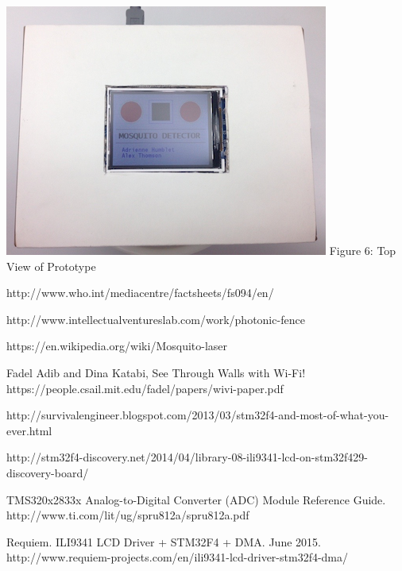 \documentclass[twoside]{article}
\begin{document}
\begin{multicols}{2}
\begin{center}
\includegraphics[scale=0.40]{topView.png}
\newline Figure 6:  Top View of Prototype
\end{center}


\begin{thebibliography}{99} %

 http://www.who.int/mediacentre/factsheets/fs094/en/

 http://www.intellectualventureslab.com/work/photonic-fence

 https://en.wikipedia.org/wiki/Mosquito-laser

 Fadel Adib and Dina Katabi, See Through Walls with Wi-Fi! https://people.csail.mit.edu/fadel/papers/wivi-paper.pdf 

 http://survivalengineer.blogspot.com/2013/03/stm32f4-and-most-of-what-you-ever.html

 http://stm32f4-discovery.net/2014/04/library-08-ili9341-lcd-on-stm32f429-discovery-board/

 TMS320x2833x Analog-to-Digital Converter
(ADC) Module Reference Guide. http://www.ti.com/lit/ug/spru812a/spru812a.pdf

 Requiem. ILI9341 LCD Driver + STM32F4 + DMA. June 2015. http://www.requiem-projects.com/en/ili9341-lcd-driver-stm32f4-dma/





\end{thebibliography}


\end{multicols}
\end{document}
